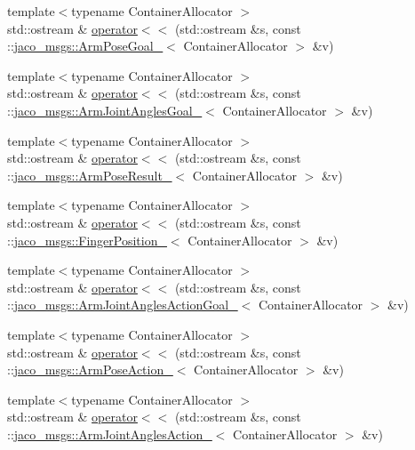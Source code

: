 \begin{DoxyCompactItemize}
\item 
{\footnotesize template$<$typename Container\+Allocator $>$ }\\std\+::ostream \& \hyperlink{namespacejaco__msgs_a38f112be3f7ae667ae30997b93811b5e}{operator$<$$<$} (std\+::ostream \&s, const \+::\hyperlink{structjaco__msgs_1_1ArmPoseGoal__}{jaco\+\_\+msgs\+::\+Arm\+Pose\+Goal\+\_\+}$<$ Container\+Allocator $>$ \&v)
\item 
{\footnotesize template$<$typename Container\+Allocator $>$ }\\std\+::ostream \& \hyperlink{namespacejaco__msgs_ad6db2fe4071bf477b4c209dcd04ccc54}{operator$<$$<$} (std\+::ostream \&s, const \+::\hyperlink{structjaco__msgs_1_1ArmJointAnglesGoal__}{jaco\+\_\+msgs\+::\+Arm\+Joint\+Angles\+Goal\+\_\+}$<$ Container\+Allocator $>$ \&v)
\item 
{\footnotesize template$<$typename Container\+Allocator $>$ }\\std\+::ostream \& \hyperlink{namespacejaco__msgs_a60fa42e8b723f3acfb44214534f4c23c}{operator$<$$<$} (std\+::ostream \&s, const \+::\hyperlink{structjaco__msgs_1_1ArmPoseResult__}{jaco\+\_\+msgs\+::\+Arm\+Pose\+Result\+\_\+}$<$ Container\+Allocator $>$ \&v)
\item 
{\footnotesize template$<$typename Container\+Allocator $>$ }\\std\+::ostream \& \hyperlink{namespacejaco__msgs_a6402588389ef1286b2469fc35961f292}{operator$<$$<$} (std\+::ostream \&s, const \+::\hyperlink{structjaco__msgs_1_1FingerPosition__}{jaco\+\_\+msgs\+::\+Finger\+Position\+\_\+}$<$ Container\+Allocator $>$ \&v)
\item 
{\footnotesize template$<$typename Container\+Allocator $>$ }\\std\+::ostream \& \hyperlink{namespacejaco__msgs_acaac98a98c7a8c8fef4b55bbc062c6d3}{operator$<$$<$} (std\+::ostream \&s, const \+::\hyperlink{structjaco__msgs_1_1ArmJointAnglesActionGoal__}{jaco\+\_\+msgs\+::\+Arm\+Joint\+Angles\+Action\+Goal\+\_\+}$<$ Container\+Allocator $>$ \&v)
\item 
{\footnotesize template$<$typename Container\+Allocator $>$ }\\std\+::ostream \& \hyperlink{namespacejaco__msgs_a5bddc4605f1d48f2cf98e680083f5094}{operator$<$$<$} (std\+::ostream \&s, const \+::\hyperlink{structjaco__msgs_1_1ArmPoseAction__}{jaco\+\_\+msgs\+::\+Arm\+Pose\+Action\+\_\+}$<$ Container\+Allocator $>$ \&v)
\item 
{\footnotesize template$<$typename Container\+Allocator $>$ }\\std\+::ostream \& \hyperlink{namespacejaco__msgs_a8c47b09389087aaaf1eb33c00097affb}{operator$<$$<$} (std\+::ostream \&s, const \+::\hyperlink{structjaco__msgs_1_1ArmJointAnglesAction__}{jaco\+\_\+msgs\+::\+Arm\+Joint\+Angles\+Action\+\_\+}$<$ Container\+Allocator $>$ \&v)

\end{DoxyCompactItemize}
